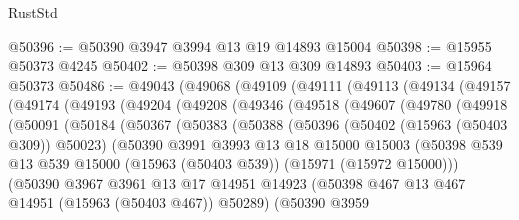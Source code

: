 \begin{lexlean}{RustStd}
\begin{coremodule}
{\begin{coremodule}
{{{{{{{{{{{{{{{{{{{{{{{{{{{{{{{{{{{{{{{{{{{{{{{{{{{{{{{{{{{{@50396 := @50390 @3947 @3994 @13 @19 @14893 @15004
@50398 := @15955 @50373 @4245
@50402 := @50398 @309 @13 @309 @14893
@50403 := @15964 @50373
@50486 := @49043
    (@49068
      (@49109
        (@49111
          (@49113
            (@49134
              (@49157
                (@49174
                  (@49193
                    (@49204
                      (@49208
                        (@49346
                          (@49518
                            (@49607
                              (@49780
                                (@49918
                                  (@50091
                                    (@50184
                                      (@50367
                                        (@50383
                                          (@50388
                                            (@50396
                                              (@50402 (@15963 (@50403 @309)) @50023)
                                              (@50390
                                                @3991
                                                @3993
                                                @13
                                                @18
                                                @15000
                                                @15003
                                                (@50398
                                                  @539
                                                  @13
                                                  @539
                                                  @15000
                                                  (@15963 (@50403 @539))
                                                  (@15971 (@15972 @15000)))
                                                (@50390
                                                  @3967
                                                  @3961
                                                  @13
                                                  @17
                                                  @14951
                                                  @14923
                                                  (@50398
                                                    @467
                                                    @13
                                                    @467
                                                    @14951
                                                    (@15963 (@50403 @467))
                                                    @50289)
                                                  (@50390
                                                    @3959
}}}}}}}}}}}}}}}}}}}}}}}}}}}}}}}}}}}}}}}}}}}}}}}}}}}}}}}}}}}}
\end{coremodule}}
\end{coremodule}
\end{lexlean}
